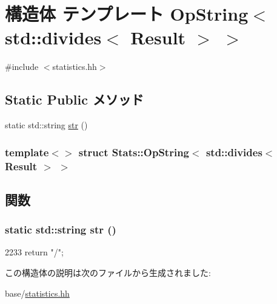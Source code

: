 \hypertarget{structStats_1_1OpString_3_01std_1_1divides_3_01Result_01_4_01_4}{
\section{構造体 テンプレート OpString$<$ std::divides$<$ Result $>$ $>$}
\label{structStats_1_1OpString_3_01std_1_1divides_3_01Result_01_4_01_4}
}


{\ttfamily \#include $<$statistics.hh$>$}\subsection*{Static Public メソッド}
\begin{DoxyCompactItemize}
\item 
static std::string \hyperlink{structStats_1_1OpString_3_01std_1_1divides_3_01Result_01_4_01_4_ac257b778f78be168137f5dc30893349b}{str} ()
\end{DoxyCompactItemize}
\subsubsection*{template$<$$>$ struct Stats::OpString$<$ std::divides$<$ Result $>$ $>$}



\subsection{関数}
\hypertarget{structStats_1_1OpString_3_01std_1_1divides_3_01Result_01_4_01_4_ac257b778f78be168137f5dc30893349b}{
\subsubsection[{str}]{\setlength{\rightskip}{0pt plus 5cm}static std::string str ()}}
\label{structStats_1_1OpString_3_01std_1_1divides_3_01Result_01_4_01_4_ac257b778f78be168137f5dc30893349b}



\begin{DoxyCode}
2233 { return "/"; }
\end{DoxyCode}


この構造体の説明は次のファイルから生成されました:\begin{DoxyCompactItemize}
\item 
base/\hyperlink{statistics_8hh}{statistics.hh}\end{DoxyCompactItemize}
